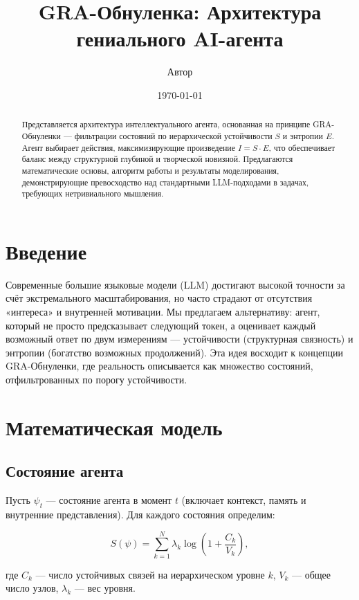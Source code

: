 \documentclass[12pt,a4paper]{article}
\title{GRA-Обнуленка: Архитектура гениального AI-агента}
\author{Автор}
\date{\today}
\begin{document}
\maketitle

\begin{abstract}
Представляется архитектура интеллектуального агента, основанная на принципе GRA-Обнуленки — фильтрации состояний по иерархической устойчивости $S$ и энтропии $E$. Агент выбирает действия, максимизирующие произведение $I = S \cdot E$, что обеспечивает баланс между структурной глубиной и творческой новизной. Предлагаются математические основы, алгоритм работы и результаты моделирования, демонстрирующие превосходство над стандартными LLM-подходами в задачах, требующих нетривиального мышления.
\end{abstract}

\section{Введение}

Современные большие языковые модели (LLM) достигают высокой точности за счёт экстремального масштабирования, но часто страдают от отсутствия «интереса» и внутренней мотивации. Мы предлагаем альтернативу: агент, который не просто предсказывает следующий токен, а оценивает каждый возможный ответ по двум измерениям — устойчивости (структурная связность) и энтропии (богатство возможных продолжений). Эта идея восходит к концепции GRA-Обнуленки, где реальность описывается как множество состояний, отфильтрованных по порогу устойчивости.

\section{Математическая модель}

\subsection{Состояние агента}

Пусть $\psi_t$ — состояние агента в момент $t$ (включает контекст, память и внутренние представления). Для каждого состояния определим:

\begin{equation}
S(\psi) = \sum_{k=1}^{N} \lambda_k \log\!\left(1 + \frac{C_k}{V_k}\right),
\end{equation}

где $C_k$ — число устойчивых связей на иерархическом уровне $k$, $V_k$ — общее число узлов, $\lambda_k$ — вес уровня.
\end{document}
